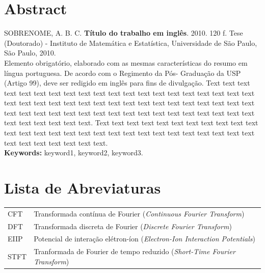 \documentclass[11pt,twoside,a4paper]{book}
\theoremstyle{note}
\begin{document}
\chapter*{Abstract}
\noindent SOBRENOME, A. B. C. \textbf{Título do trabalho em inglês}. 
2010. 120 f.
Tese (Doutorado) - Instituto de Matemática e Estatística,
Universidade de São Paulo, São Paulo, 2010.
\\


Elemento obrigatório, elaborado com as mesmas características do resumo em
língua portuguesa. De acordo com o Regimento da Pós- Graduação da USP (Artigo
99), deve ser redigido em inglês para fins de divulgação. 
Text text text text text text text text text text text text text text text text
text text text text text text text text text text text text text text text text
text text text text text text text text text text text text text text text text
text text text text text text text text text text text text.
Text text text text text text text text text text text text text text text text
text text text text text text text text text text text text text text text text
text text text.
\\

\noindent \textbf{Keywords:} keyword1, keyword2, keyword3.

\tableofcontents    %

\chapter{Lista de Abreviaturas}
\begin{tabular}{ll}
         CFT         & Transformada contínua de Fourier (\emph{Continuous Fourier Transform})\\
         DFT         & Transformada discreta de Fourier (\emph{Discrete Fourier Transform})\\
        EIIP         & Potencial de interação elétron-íon (\emph{Electron-Ion Interaction Potentials})\\
        STFT         & Tranformada de Fourier de tempo reduzido (\emph{Short-Time Fourier Transform})\\
\end{tabular}

\end{document}
